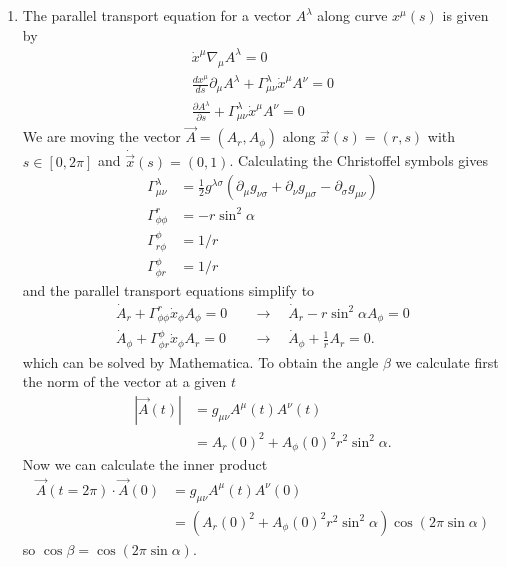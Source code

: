 \documentclass[10pt,a4paper]{book}
\theoremstyle{definition}
\begin{document}
\begin{enumerate}
\item The parallel transport equation for a vector $A^\lambda$ along curve $x^\mu(s)$ is given by
\begin{align}
\dot x^\mu\nabla_\mu A^\lambda=0\\
\frac{dx^\mu}{ds}\partial_\mu A^\lambda+\Gamma^\lambda_{\mu\nu}\dot x^{\mu}A^\nu=0\\
\frac{\partial A^\lambda}{\partial s}+\Gamma^\lambda_{\mu\nu}\dot x^{\mu}A^\nu=0
\end{align}
We are moving the vector $\vec{A}=(A_r,A_\phi)$ along $\vec{x}(s)=(r,s)$ with $s\in[0,2\pi]$ and $\dot{\vec{x}}(s)=(0,1)$. Calculating the Christoffel symbols gives 
\begin{align}
\Gamma^\lambda_{\mu\nu}&=\frac{1}{2}g^{\lambda\sigma}(\partial_\mu g_{\nu\sigma}+\partial_\nu g_{\mu\sigma}-\partial_\sigma g_{\mu\nu})\\
\Gamma^r_{\phi\phi}&=-r\sin^2\alpha\\
\Gamma^\phi_{r\phi}&=1/r\\
\Gamma^\phi_{\phi r}&=1/r
\end{align}
and the parallel transport equations simplify to
\begin{align}
\dot{A}_r+\Gamma^r_{\phi\phi}\dot{x}_\phi A_\phi=0&\quad\rightarrow\quad \dot{A}_r-r\sin^2\alpha A_\phi=0\\
\dot{A}_\phi+\Gamma^\phi_{\phi r}\dot{x}_\phi A_r=0&\quad\rightarrow\quad \dot{A}_\phi+\frac{1}{r}A_r=0.
\end{align}
which can be solved by Mathematica. To obtain the angle $\beta$ we calculate first the norm of the vector at a given $t$
\begin{align}
	|\vec{A}(t)|&=g_{\mu\nu}A^\mu(t) A^\nu(t)\\
	&=A_r(0)^2+A_\phi(0)^2r^2\sin^2\alpha.
\end{align}
Now we can calculate the inner product
\begin{align}
	\vec{A}(t=2\pi)\cdot\vec{A}(0)&=g_{\mu\nu}A^\mu(t) A^\nu(0)\\
	&=(A_r(0)^2+A_\phi(0)^2r^2\sin^2\alpha)\cos(2\pi\sin\alpha)
\end{align}
so $\cos\beta=\cos(2\pi\sin\alpha)$.

\end{enumerate}
\end{document}
